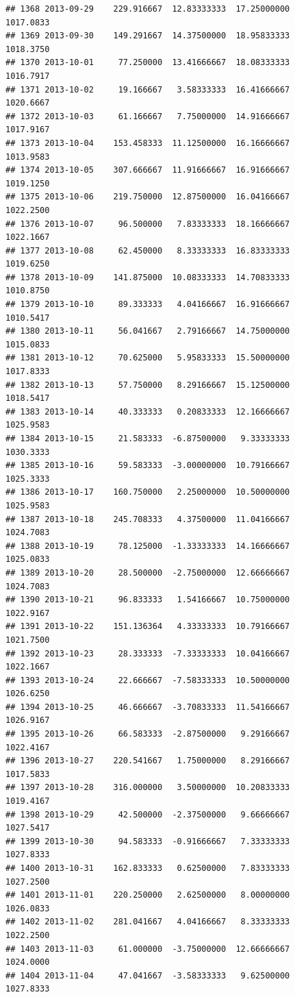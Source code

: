 \documentclass[
]{article}
\begin{document}
\begin{verbatim}
## 1368 2013-09-29    229.916667  12.83333333  17.25000000    1017.0833
## 1369 2013-09-30    149.291667  14.37500000  18.95833333    1018.3750
## 1370 2013-10-01     77.250000  13.41666667  18.08333333    1016.7917
## 1371 2013-10-02     19.166667   3.58333333  16.41666667    1020.6667
## 1372 2013-10-03     61.166667   7.75000000  14.91666667    1017.9167
## 1373 2013-10-04    153.458333  11.12500000  16.16666667    1013.9583
## 1374 2013-10-05    307.666667  11.91666667  16.91666667    1019.1250
## 1375 2013-10-06    219.750000  12.87500000  16.04166667    1022.2500
## 1376 2013-10-07     96.500000   7.83333333  18.16666667    1022.1667
## 1377 2013-10-08     62.450000   8.33333333  16.83333333    1019.6250
## 1378 2013-10-09    141.875000  10.08333333  14.70833333    1010.8750
## 1379 2013-10-10     89.333333   4.04166667  16.91666667    1010.5417
## 1380 2013-10-11     56.041667   2.79166667  14.75000000    1015.0833
## 1381 2013-10-12     70.625000   5.95833333  15.50000000    1017.8333
## 1382 2013-10-13     57.750000   8.29166667  15.12500000    1018.5417
## 1383 2013-10-14     40.333333   0.20833333  12.16666667    1025.9583
## 1384 2013-10-15     21.583333  -6.87500000   9.33333333    1030.3333
## 1385 2013-10-16     59.583333  -3.00000000  10.79166667    1025.3333
## 1386 2013-10-17    160.750000   2.25000000  10.50000000    1025.9583
## 1387 2013-10-18    245.708333   4.37500000  11.04166667    1024.7083
## 1388 2013-10-19     78.125000  -1.33333333  14.16666667    1025.0833
## 1389 2013-10-20     28.500000  -2.75000000  12.66666667    1024.7083
## 1390 2013-10-21     96.833333   1.54166667  10.75000000    1022.9167
## 1391 2013-10-22    151.136364   4.33333333  10.79166667    1021.7500
## 1392 2013-10-23     28.333333  -7.33333333  10.04166667    1022.1667
## 1393 2013-10-24     22.666667  -7.58333333  10.50000000    1026.6250
## 1394 2013-10-25     46.666667  -3.70833333  11.54166667    1026.9167
## 1395 2013-10-26     66.583333  -2.87500000   9.29166667    1022.4167
## 1396 2013-10-27    220.541667   1.75000000   8.29166667    1017.5833
## 1397 2013-10-28    316.000000   3.50000000  10.20833333    1019.4167
## 1398 2013-10-29     42.500000  -2.37500000   9.66666667    1027.5417
## 1399 2013-10-30     94.583333  -0.91666667   7.33333333    1027.8333
## 1400 2013-10-31    162.833333   0.62500000   7.83333333    1027.2500
## 1401 2013-11-01    220.250000   2.62500000   8.00000000    1026.0833
## 1402 2013-11-02    281.041667   4.04166667   8.33333333    1022.2500
## 1403 2013-11-03     61.000000  -3.75000000  12.66666667    1024.0000
## 1404 2013-11-04     47.041667  -3.58333333   9.62500000    1027.8333

\end{verbatim}
\end{document}
